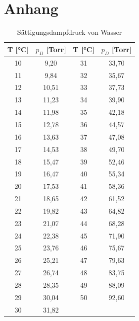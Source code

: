 \onecolumn
\chapter{Anhang}
\begin{table}[h!]
\centering
\begin{tabular}{c|c||c|c}
\hline
T [°C] & $p_D$ [Torr] & T [°C] & $p_D$ [Torr] \\
\hline
10 & 9,20  & 31 & 33,70 \\
11 & 9,84  & 32 & 35,67 \\
12 & 10,51 & 33 & 37,73 \\
13 & 11,23 & 34 & 39,90 \\
14 & 11,98 & 35 & 42,18 \\
15 & 12,78 & 36 & 44,57 \\
16 & 13,63 & 37 & 47,08 \\
17 & 14,53 & 38 & 49,70 \\
18 & 15,47 & 39 & 52,46 \\
19 & 16,47 & 40 & 55,34 \\
20 & 17,53 & 41 & 58,36 \\
21 & 18,65 & 42 & 61,52 \\
22 & 19,82 & 43 & 64,82 \\
23 & 21,07 & 44 & 68,28 \\
24 & 22,38 & 45 & 71,90 \\
25 & 23,76 & 46 & 75,67 \\
26 & 25,21 & 47 & 79,63 \\
27 & 26,74 & 48 & 83,75 \\
28 & 28,35 & 49 & 88,09 \\
29 & 30,04 & 50 & 92,60 \\
30 & 31,82 &    &       \\
\hline
\end{tabular}
\caption{Sättigungsdampfdruck von Wasser}
\end{table}

\newpage

